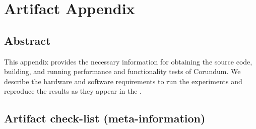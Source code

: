 

\clearpage 
\appendix
\section{Artifact Appendix}

\subsection{Abstract}

This appendix provides the necessary information for obtaining the source code,
building, and running performance and functionality tests of Corundum. 
We describe the hardware and software requirements to run the
experiments and reproduce the results as they appear in the .

\subsection{Artifact check-list (meta-information)}


